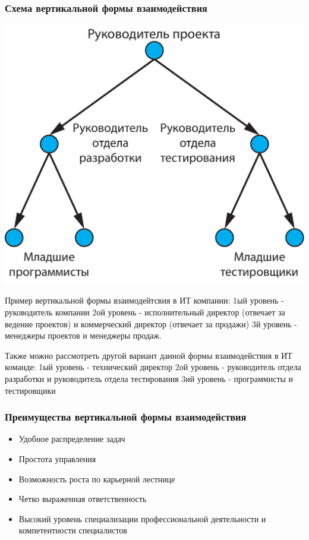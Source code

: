 \documentclass{../industrial-development}
\begin{document}
\begin{frame} \frametitle{Схема вертикальной формы взаимодействия}
	\begin{block}{}
		\centerline{\includegraphics[height=0.7\textheight]{vertical.pdf}}
	\end{block}
\end{frame}

\lecturenotes
Пример вертикальной формы взаимодейтсвия в ИТ компании:
1ый уровень - руководитель компании
2ой уровень - исполнительный директор (отвечает за ведение проектов) и коммерческий директор (отвечает за продажи)
3й уровень - менеджеры проектов и менеджеры продаж.

Также можно рассмотреть другой вариант данной формы взаимодействия в ИТ команде:
1ый уровень -  технический директор
2ой уровень -  руководитель отдела разработки и руководитель отдела тестирования
3ий уровень - программисты и тестировщики


\begin{frame} \frametitle{Преимущества вертикальной формы взаимодействия}

  
  \begin{itemize}
  \item Удобное распределение задач
  \item Простота управления
  \item Возможность роста по карьерной лестнице
  \item Четко выраженная ответственность
  \item Высокий уровень специализации профессиональной деятельности и компетентности специалистов

  \end{itemize}
\end{frame}
\end{document}
